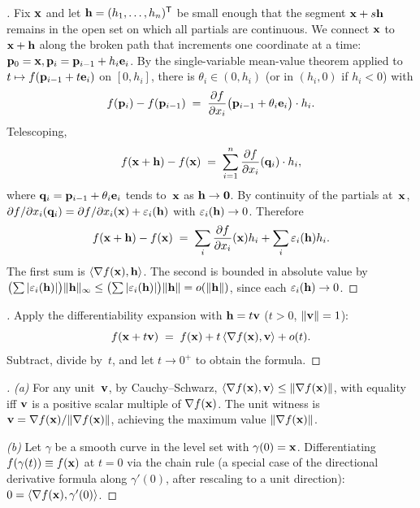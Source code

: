 \begin{proof}[]
Fix $\mathbf{x}$ and let $\mathbf{h} = (h_1, \dots, h_n)^{\mathsf{T}}$ be small enough
that the segment $\mathbf{x} + s\mathbf{h}$ remains in the open set on which
all partials are continuous. We connect $\mathbf{x}$ to $\mathbf{x} + \mathbf{h}$
along the broken path that increments one coordinate at a time:
$\mathbf{p}_0 = \mathbf{x}, \mathbf{p}_i = \mathbf{p}_{i-1} + h_i \mathbf{e}_i$.
By the single-variable mean-value theorem applied to
$t \mapsto f(\mathbf{p}_{i-1} + t \mathbf{e}_i)$ on $[0, h_i]$, there is
$\theta_i \in (0, h_i)$ (or in $(h_i, 0)$ if $h_i < 0$) with
\[
  f(\mathbf{p}_i) - f(\mathbf{p}_{i-1}) \;=\; \frac{\partial f}{\partial x_i}\bigl(\mathbf{p}_{i-1} + \theta_i \mathbf{e}_i\bigr) \cdot h_i.
\]
Telescoping,
\[
  f(\mathbf{x} + \mathbf{h}) - f(\mathbf{x}) \;=\; \sum_{i=1}^{n} \frac{\partial f}{\partial x_i}(\mathbf{q}_i) \cdot h_i,
\]
where $\mathbf{q}_i = \mathbf{p}_{i-1} + \theta_i \mathbf{e}_i$ tends
to~$\mathbf{x}$ as $\mathbf{h} \to \mathbf{0}$. By continuity of the
partials at~$\mathbf{x}$,
$\partial f / \partial x_i(\mathbf{q}_i) = \partial f / \partial x_i(\mathbf{x}) + \varepsilon_i(\mathbf{h})$
with $\varepsilon_i(\mathbf{h}) \to 0$. Therefore
\[
  f(\mathbf{x} + \mathbf{h}) - f(\mathbf{x}) \;=\; \sum_i \frac{\partial f}{\partial x_i}(\mathbf{x}) h_i + \sum_i \varepsilon_i(\mathbf{h}) h_i.
\]
The first sum is $\langle \nabla f(\mathbf{x}), \mathbf{h} \rangle$. The
second is bounded in absolute value by
$\bigl(\sum |\varepsilon_i(\mathbf{h})|\bigr) \|\mathbf{h}\|_\infty \le \bigl(\sum |\varepsilon_i(\mathbf{h})|\bigr) \|\mathbf{h}\| = o(\|\mathbf{h}\|)$,
since each $\varepsilon_i(\mathbf{h}) \to 0$.
\end{proof}

\begin{proof}[]
Apply the differentiability expansion with $\mathbf{h} = t\mathbf{v}$
($t > 0$, $\|\mathbf{v}\| = 1$):
\[
  f(\mathbf{x} + t\mathbf{v}) \;=\; f(\mathbf{x}) + t\, \langle \nabla f(\mathbf{x}), \mathbf{v} \rangle + o(t).
\]
Subtract, divide by~$t$, and let $t \to 0^{+}$ to obtain the formula.
\end{proof}

\begin{proof}[]
\emph{(a)} For any unit~$\mathbf{v}$, by Cauchy--Schwarz,
$\langle \nabla f(\mathbf{x}), \mathbf{v} \rangle \le \|\nabla f(\mathbf{x})\|$,
with equality iff $\mathbf{v}$ is a positive scalar multiple of
$\nabla f(\mathbf{x})$. The unit witness is
$\mathbf{v} = \nabla f(\mathbf{x}) / \|\nabla f(\mathbf{x})\|$, achieving
the maximum value $\|\nabla f(\mathbf{x})\|$.

\emph{(b)} Let $\gamma$ be a smooth curve in the level set with
$\gamma(0) = \mathbf{x}$. Differentiating $f(\gamma(t)) \equiv f(\mathbf{x})$
at $t = 0$ via the chain rule (a special case of the directional
derivative formula along $\gamma'(0)$, after rescaling to a unit
direction): $0 = \langle \nabla f(\mathbf{x}), \gamma'(0) \rangle$.
\end{proof}

